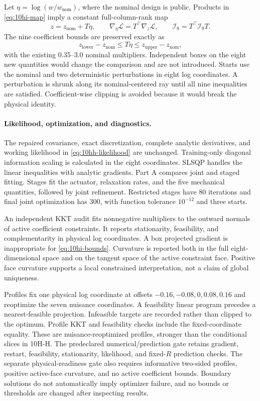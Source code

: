 Let $\eta=\log(w/w_{\mathrm{nom}})$, where the nominal design is public.
Products in \eqref{eq:10hi-map} imply a constant full-column-rank map
\begin{equation}
 z=z_{\mathrm{nom}}+T\eta,\qquad
 \nabla_\eta\mathcal L=T^\top\nabla_z\mathcal L,\qquad
 \mathcal I_8=T^\top\mathcal I_9 T.
\end{equation}
The nine coefficient bounds are preserved exactly as
\begin{equation}
 z_{\mathrm{lower}}-z_{\mathrm{nom}}
 \le T\eta\le
 z_{\mathrm{upper}}-z_{\mathrm{nom}},
 \label{eq:10hi-bounds}
\end{equation}
with the existing 0.35--3.0 nominal multipliers. Independent boxes on the
eight new quantities would change the comparison and are not introduced.
Starts use the nominal and two deterministic perturbations in eight log
coordinates. A perturbation is shrunk along its nominal-centered ray until
all nine inequalities are satisfied. Coefficient-wise clipping is avoided
because it would break the physical identity.

\paragraph{Likelihood, optimization, and diagnostics.}
The repaired covariance, exact discretization, complete analytic derivatives,
and working likelihood in \eqref{eq:10hh-likelihood} are unchanged.
Training-only diagonal information scaling is calculated in the eight
coordinates. SLSQP handles the linear inequalities with analytic gradients.
Part A compares joint and staged fitting. Stages fit the actuator, relaxation
rates, and the five mechanical quantities, followed by joint refinement.
Restricted stages have 80 iterations and final joint optimization has 300,
with function tolerance $10^{-12}$ and three starts.

An independent KKT audit fits nonnegative multipliers to the outward normals
of active coefficient constraints. It reports stationarity, feasibility, and
complementarity in physical log coordinates. A box projected gradient is
inappropriate for \eqref{eq:10hi-bounds}. Curvature is reported both in the full
eight-dimensional space and on the tangent space of the active constraint
face. Positive face curvature supports a local constrained interpretation,
not a claim of global uniqueness.

Profiles fix one physical log coordinate at offsets
$-0.16,-0.08,0,0.08,0.16$ and reoptimize the seven nuisance coordinates.
A feasibility linear program precedes a nearest-feasible projection.
Infeasible targets are recorded rather than clipped to the optimum.
Profile KKT and feasibility checks include the fixed-coordinate equality.
These are nuisance-reoptimized profiles, stronger than the conditional
slices in 10H-H. The predeclared numerical/prediction gate retains gradient,
restart, feasibility, stationarity, likelihood, and fixed-$R$ prediction
checks. The separate physical-readiness gate also requires informative
two-sided profiles, positive active-face curvature, and no active coefficient
bounds. Boundary solutions do not automatically imply optimizer failure,
and no bounds or thresholds are changed after inspecting results.

